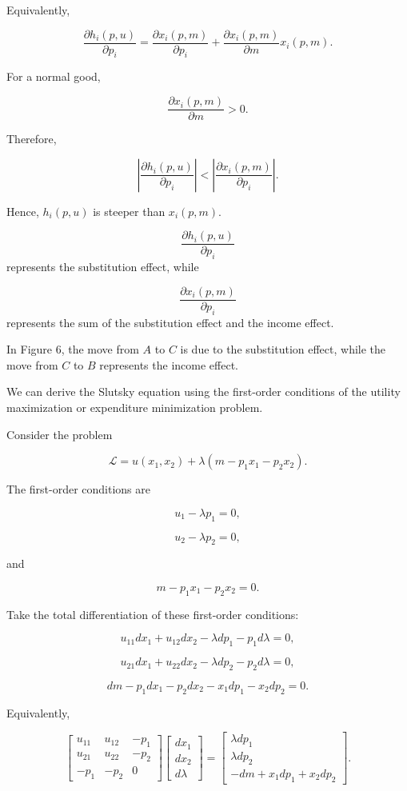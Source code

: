 Equivalently,

\[
\frac{\partial h_i(p,u)}{\partial p_i}
=
\frac{\partial x_i(p,m)}{\partial p_i}
+
\frac{\partial x_i(p,m)}{\partial m}x_i(p,m).
\]

For a normal good,

\[
\frac{\partial x_i(p,m)}{\partial m}>0.
\]

Therefore,

\[
\left|
\frac{\partial h_i(p,u)}{\partial p_i}
\right|
<
\left|
\frac{\partial x_i(p,m)}{\partial p_i}
\right|.
\]

Hence, \(h_i(p,u)\) is steeper than \(x_i(p,m)\).




\[
\frac{\partial h_i(p,u)}{\partial p_i}
\]
represents the substitution effect, while

\[
\frac{\partial x_i(p,m)}{\partial p_i}
\]
represents the sum of the substitution effect and the income effect.

In Figure 6, the move from \(A\) to \(C\) is due to the substitution effect, while the move from \(C\) to \(B\) represents the income effect.

\medskip

We can derive the Slutsky equation using the first-order conditions of the utility maximization or expenditure minimization problem.

Consider the problem

\[
\mathcal{L}
=
u(x_1,x_2)
+
\lambda(m-p_1x_1-p_2x_2).
\]

The first-order conditions are

\[
u_1-\lambda p_1=0,
\]

\[
u_2-\lambda p_2=0,
\]

and

\[
m-p_1x_1-p_2x_2=0.
\]

Take the total differentiation of these first-order conditions:

\[
u_{11}dx_1+u_{12}dx_2-\lambda dp_1-p_1d\lambda=0,
\]

\[
u_{21}dx_1+u_{22}dx_2-\lambda dp_2-p_2d\lambda=0,
\]

\[
dm-p_1dx_1-p_2dx_2-x_1dp_1-x_2dp_2=0.
\]

Equivalently,

\[
\begin{bmatrix}
u_{11} & u_{12} & -p_1 \\
u_{21} & u_{22} & -p_2 \\
-p_1 & -p_2 & 0
\end{bmatrix}
\begin{bmatrix}
dx_1 \\
dx_2 \\
d\lambda
\end{bmatrix}
=
\begin{bmatrix}
\lambda dp_1 \\
\lambda dp_2 \\
-dm+x_1dp_1+x_2dp_2
\end{bmatrix}.
\]

